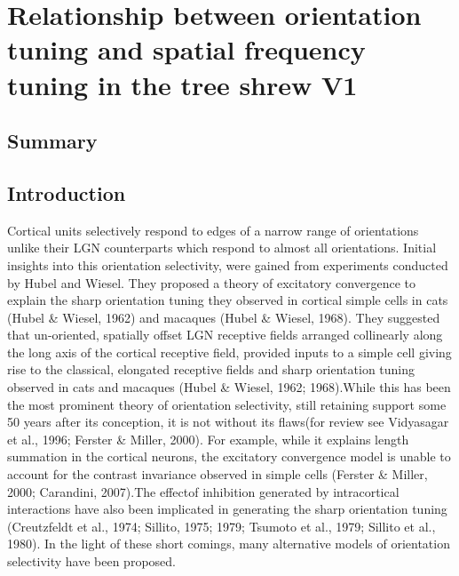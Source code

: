 \chapter {Relationship between orientation tuning and spatial frequency tuning in the tree shrew V1}
\pagebreak
\section{Summary}
\pagebreak
\section{Introduction}

Cortical units selectively respond to edges of a narrow range of orientations unlike their LGN counterparts which respond to almost all orientations. Initial insights into this orientation selectivity, were gained from experiments conducted by Hubel and Wiesel. They proposed a theory of excitatory convergence to explain the sharp orientation tuning they observed in cortical simple cells in cats (Hubel \& Wiesel, 1962) and macaques (Hubel \& Wiesel, 1968). They suggested that un-oriented, spatially offset LGN receptive fields arranged collinearly along the long axis of the cortical receptive field, provided inputs to a simple cell giving rise to the classical, elongated receptive fields and sharp orientation tuning observed in cats and macaques (Hubel \& Wiesel, 1962; 1968).While this has been the most prominent theory of orientation selectivity, still retaining support some 50 years after its conception, it is not without its flaws(for review see Vidyasagar et al., 1996; Ferster \& Miller, 2000). For example, while it explains length summation in the cortical neurons, the excitatory convergence model is unable to account for the contrast invariance observed in simple cells (Ferster \& Miller, 2000; Carandini, 2007).The effectof inhibition generated by intracortical interactions have also been implicated in generating the sharp orientation tuning (Creutzfeldt et al., 1974; Sillito, 1975; 1979; Tsumoto et al., 1979; Sillito et al., 1980). In the light of these short comings, many alternative models of orientation selectivity have been proposed. 

